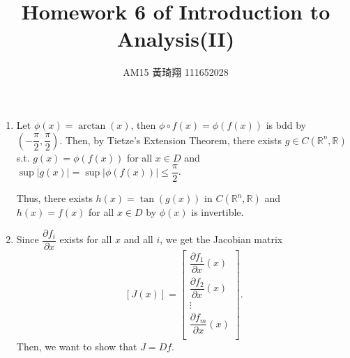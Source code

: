 \documentclass[12pt]{article}
\title{Homework 6 of Introduction to Analysis(II)}
\author{AM15 黃琦翔 111652028}
\begin{document}
\maketitle
\begin{enumerate}
    \item Let $\phi(x) = \arctan(x)$, then $\phi \circ f(x) = \phi(f(x))$ is bdd by $(-\dfrac{\pi}{2}, \dfrac{\pi}{2})$.
    Then, by Tietze's Extension Theorem, there exists $g \in C(\mathbb{R}^n, \mathbb{R})$ s.t. 
    $g(x) = \phi(f(x))$ for all $x\in D$ and $\sup|g(x)| = \sup |\phi(f(x))|\leq \dfrac{\pi}{2}$.

    Thus, there exists $h(x) = \tan(g(x))$ in $C(\mathbb{R}^n, \mathbb{R})$ and $h(x) = f(x)$ for all $x\in D$ by 
    $\phi(x)$ is invertible.

    \item Since $\dfrac{\partial f_i}{\partial x}$ exists for all $x$ and all $i$, 
    we get the Jacobian matrix $$\left[J(x)\right] = \begin{bmatrix}
        \dfrac{\partial f_1}{\partial x}(x)\\
        \dfrac{\partial f_2}{\partial x}(x)\\
        \vdots\\
        \dfrac{\partial f_m}{\partial x}(x)\\
    \end{bmatrix}.$$
    Then, we want to show that $J = Df$.
\end{enumerate}
\end{document}
